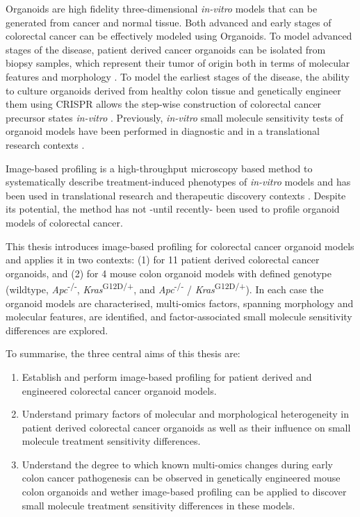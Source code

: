\begin{flushleft}
Organoids are high fidelity three-dimensional \textit{in-vitro} models that can be generated from cancer and normal tissue. Both advanced and early stages of colorectal cancer can be effectively modeled using Organoids. To model advanced stages of the disease, patient derived cancer organoids can be isolated from biopsy samples, which represent their tumor of origin both in terms of molecular features and morphology \citep{pauliPersonalizedVitroVivo2017a}. To model the earliest stages of the disease, the ability to culture organoids derived from healthy colon tissue and genetically engineer them using CRISPR allows the step-wise construction of colorectal cancer precursor states \textit{in-vitro} \citep{matanoModelingColorectalCancer2015a, drostUseCRISPRmodifiedHuman2017}. Previously, \textit{in-vitro} small molecule sensitivity tests of organoid models have been performed in diagnostic and in a translational research contexts \citep{vandeweteringProspectiveDerivationLiving2015, vlachogiannisPatientderivedOrganoidsModel2018, ganeshRectalCancerOrganoid2019, ooftPatientderivedOrganoidsCan2019, yaoPatientDerivedOrganoidsPredict2020}. 
\par
Image-based profiling is a high-throughput microscopy based method to systematically describe treatment-induced phenotypes of \textit{in-vitro} models and has been used in translational research and therapeutic discovery contexts \citep{caicedoApplicationsImagebasedProfiling2016}. Despite its potential, the method has not -until recently- \citep{betgeDruginducedPhenotypicLandscape2022} been used to profile organoid models of colorectal cancer.
\par

This thesis introduces image-based profiling for colorectal cancer organoid models and applies it in two contexts: (1) for 11 patient derived colorectal cancer organoids, and (2) for 4 mouse colon organoid models with defined genotype (wildtype, \textit{Apc}\textsuperscript{-/-}, \textit{Kras}\textsuperscript{G12D/+}, and \textit{Apc}\textsuperscript{-/-} / \textit{Kras}\textsuperscript{G12D/+}). In each case the organoid models are characterised, multi-omics factors, spanning morphology and molecular features, are identified, and factor-associated small molecule sensitivity differences are explored. 
\bigbreak

To summarise, the three central aims of this thesis are:
\begin{enumerate}
    \item Establish and perform image-based profiling for patient derived and engineered colorectal cancer organoid models.
    \item Understand primary factors of molecular and morphological heterogeneity in patient derived colorectal cancer organoids as well as their influence on small molecule treatment sensitivity differences.
    \item Understand the degree to which known multi-omics changes during early colon cancer pathogenesis can be observed in genetically engineered mouse colon organoids and wether image-based profiling can be applied to discover small molecule treatment sensitivity differences in these models.
\end{enumerate}

\end{flushleft}